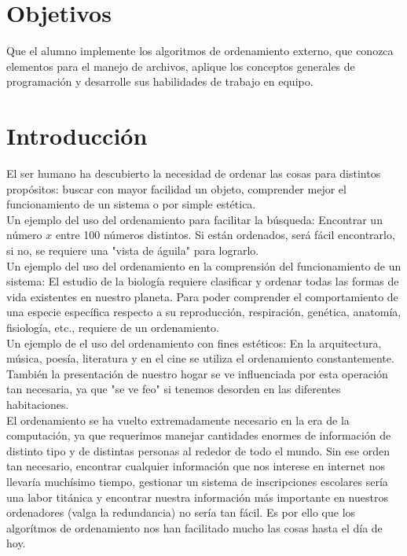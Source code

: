 \documentclass[12pt, letterpaper]{report}
\begin{document}
    \section*{Objetivos}
    Que el alumno implemente los algoritmos de ordenamiento externo, que conozca elementos para el manejo de archivos, aplique los conceptos generales de programación y desarrolle sus habilidades de trabajo en equipo.
    
    \section*{Introducción}
    El ser humano ha descubierto la necesidad de ordenar las cosas para distintos propósitos: buscar con mayor facilidad un objeto, comprender mejor el funcionamiento de un sistema o por simple estética. \\
    
    Un ejemplo del uso del ordenamiento para facilitar la búsqueda: Encontrar un número $x$ entre 100 números distintos. Si están ordenados, será fácil encontrarlo, si no, se requiere una "vista de águila" para lograrlo.\\
    
    Un ejemplo del uso del ordenamiento en la comprensión del funcionamiento de un sistema: El estudio de la biología requiere clasificar y ordenar todas las formas de vida existentes en nuestro planeta. Para poder comprender el comportamiento de una especie específica respecto a su reproducción, respiración, genética, anatomía, fisiología, etc., requiere de un ordenamiento. \\
    
    Un ejemplo de el uso del ordenamiento con fines estéticos: En la arquitectura, música, poesía, literatura y en el cine se utiliza el ordenamiento constantemente. También la presentación de nuestro hogar se ve influenciada por esta operación tan necesaria, ya que "se ve feo" si tenemos desorden en las diferentes habitaciones.\\
    
    El ordenamiento se ha vuelto extremadamente necesario en la era de la computación, ya que requerimos manejar cantidades enormes de información de distinto tipo y de distintas personas al rededor de todo el mundo. Sin ese orden tan necesario, encontrar cualquier información que nos interese en internet nos llevaría muchísimo tiempo, gestionar un sistema de inscripciones escolares sería una labor titánica y encontrar nuestra información más importante en nuestros ordenadores (valga la redundancia) no sería tan fácil. Es por ello que los algorítmos de ordenamiento nos han facilitado mucho las cosas hasta el día de hoy.\\
    
\end{document}
